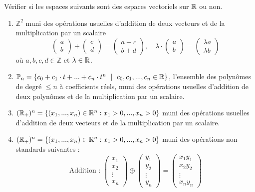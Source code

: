 \begin{exercice}
Vérifier si les espaces suivants sont des espaces vectoriels sur $\mathbb{R}$ ou non.

\begin{enumerate}
    \item $\mathbb Z^2$ muni des opérations usuelles d'addition de deux vecteurs et de la multiplication par un scalaire
        $$\begin{pmatrix} a \\ b \end{pmatrix} + \begin{pmatrix} c \\ d \end{pmatrix} = \begin{pmatrix} a + c \\ b + d \end{pmatrix}, \quad \lambda \cdot \begin{pmatrix} a \\ b \end{pmatrix} = \begin{pmatrix} \lambda a \\ \lambda b \end{pmatrix}$$
        où $a,b,c,d \in \mathbb Z$ et $\lambda \in \mathbb{R}$.
    \item $\mathbb{P}_n = \{c_0 + c_1 \cdot t + ... + c_{n} \cdot t^{n} \ \mid \ c_0, c_1, ..., c_{n} \in \mathbb{R}\}$, l'ensemble des polynômes de degré $\leq n$ à coefficients réels, muni des opérations usuelles d'addition de deux polynômes et de la multiplication par un scalaire.
    \item $(\mathbb{R}_+)^n = \{(x_1,...,x_n) \in \mathbb R^n : x_1 > 0, ..., x_n > 0\}$ muni des opérations usuelles d'addition de deux vecteurs et de la multiplication par un scalaire.
    \item $(\mathbb{R}_+)^n = \{(x_1,...,x_n) \in \mathbb R^n : x_1 > 0, ..., x_n > 0\}$ muni des opérations non-standards suivantes :
    $$\text{Addition : } \begin{pmatrix}
            x_1 \\ x_2 \\ \vdots \\ x_n
        \end{pmatrix} \oplus 
        \begin{pmatrix}
            y_1 \\ y_2 \\ \vdots \\ y_n
        \end{pmatrix} =
        \begin{pmatrix}
            x_1y_1 \\ x_2y_2 \\ \vdots \\ x_ny_n
        \end{pmatrix}$$
    

\end{enumerate}
\end{exercice}
